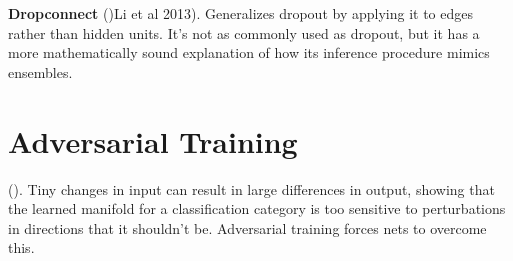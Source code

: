 \documentclass{article}
\begin{document}
\textbf{Dropconnect} (){Li et al 2013}). Generalizes dropout by applying it to edges rather than hidden units. It's not as commonly used as dropout, but it has a more mathematically sound explanation of how its inference procedure mimics ensembles.

\section{Adversarial Training}

(). Tiny changes in input can result in large differences in output, showing that the learned manifold for a classification category is too sensitive to perturbations in directions that it shouldn't be. Adversarial training forces nets to overcome this.
\end{document}
